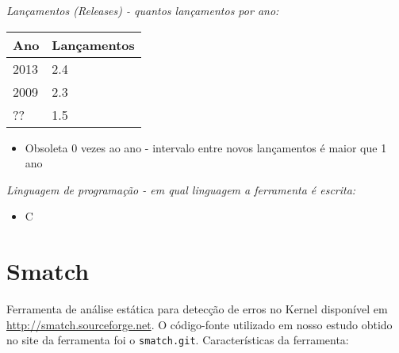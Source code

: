 \begin{description}

  \item {\it Lançamentos ({\it Releases}) - quantos lançamentos por ano:}
    \begin{table}[h!]
      \centering
      \begin{tabular}{| l | l |}
        \hline
        Ano  & Lançamentos \\
        \hline
        2013 & 2.4         \\
        2009 & 2.3         \\
        ??   & 1.5         \\
        \hline
      \end{tabular}
    \end{table}
    \begin{itemize}
      \item Obsoleta $0$ vezes ao ano - intervalo entre novos lançamentos é maior que 1 ano
    \end{itemize}

  \item {\it Linguagem de programação - em qual linguagem a ferramenta é escrita:}
    \begin{itemize}
      \item C
    \end{itemize}

\end{description}

\section{Smatch}

Ferramenta de análise estática para detecção de erros no Kernel disponível em
\url{http://smatch.sourceforge.net}. O código-fonte utilizado em nosso estudo
obtido no site da ferramenta foi o \texttt{smatch.git}. Características da
ferramenta:

